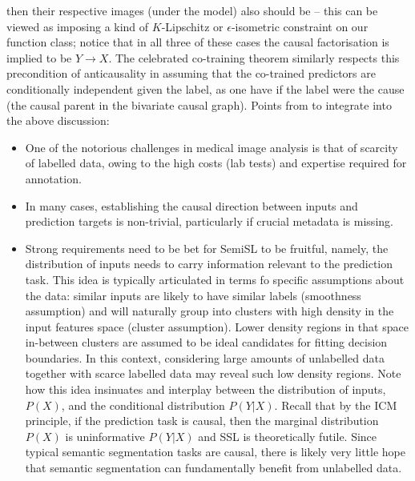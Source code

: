 then their respective images (under the model) also should be -- this can be viewed as imposing a
kind of \(K\)-Lipschitz or \(\epsilon\)-isometric constraint on our function class;
%
notice that in all three of these cases the causal factorisation is implied to be \(Y \to X \).
%
The celebrated co-training theorem \citep{blum1998combining} similarly respects this precondition
of anticausality in assuming that the co-trained predictors are conditionally independent given the
label, as one have if the label were the cause (the causal parent in the bivariate causal graph).
%
Points from \cite{castro2020causality} to integrate into the above discussion:
\begin{itemize}
        \item One of the notorious challenges in medical image analysis is that of scarcity of
          labelled data, owing to the high costs (lab tests) and expertise required  for
          annotation.
        \item In many cases, establishing the causal direction between inputs and prediction
          targets is non-trivial, particularly if crucial metadata is missing.
        \item Strong requirements need to be bet for SemiSL to be fruitful, namely, the
          distribution of inputs needs to carry information relevant to the prediction task.
          This idea is typically articulated in terms fo specific assumptions about the data:
          similar inputs are likely to have similar labels (smoothness assumption) and will
          naturally group into clusters with high density in the input features space (cluster
          assumption). Lower density regions in that space in-between clusters are assumed to be
          ideal candidates for fitting decision boundaries.
          In this context, considering large amounts of unlabelled data together with scarce
          labelled data may reveal such low density regions.
          Note how this idea insinuates and interplay between the distribution of inputs, \( P(X)
          \), and the conditional distribution \( P(Y|X) \). 
          Recall that by the ICM principle, if the prediction task is causal, then the marginal
          distribution \( P(X) \) is uninformative \wrt{} \( P(Y|X) \) and SSL is theoretically
          futile.
          Since typical semantic segmentation tasks are causal, there is likely very little hope
          that semantic segmentation can fundamentally benefit from unlabelled data.

\end{itemize}
